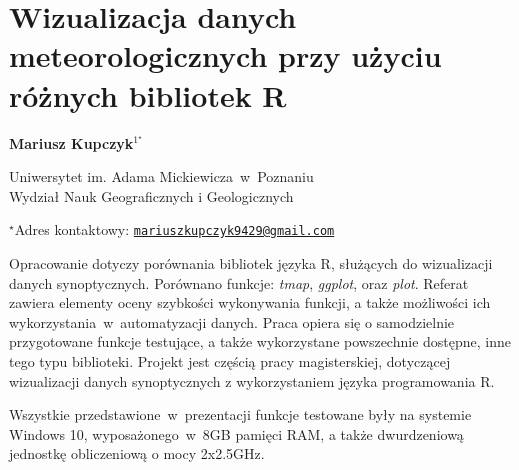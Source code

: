 \documentclass[\main/boa.tex]{subfiles}
\begin{document}
\sloppy


\section{Wizualizacja danych meteorologicznych przy użyciu różnych bibliotek R}

\begin{center}
  {\bf {} Mariusz Kupczyk$^{1^\star}$}
\end{center}

\vskip 0.3cm

\begin{affiliations}
\begin{enumerate}
\begin{minipage}{0.915\textwidth}
\centering
\item Uniwersytet im. Adama Mickiewicza~w~Poznaniu\\ Wydział Nauk Geograficznych i Geologicznych
\end{minipage}
\end{enumerate}
$^\star$Adres kontaktowy: \href{mailto:mariuszkupczyk9429@gmail.com	}{\nolinkurl{mariuszkupczyk9429@gmail.com}}\\
\end{affiliations}

\vskip 0.5cm


\vskip 0.5cm

Opracowanie dotyczy porównania bibliotek języka R, służących do wizualizacji danych synoptycznych. Porównano funkcje: \emph{tmap}, \emph{ggplot}, oraz \emph{plot}. Referat zawiera elementy oceny szybkości wykonywania funkcji, a także możliwości ich wykorzystania~w~automatyzacji danych. Praca opiera się o samodzielnie przygotowane funkcje testujące, a także wykorzystane powszechnie dostępne, inne tego typu biblioteki. Projekt jest częścią pracy magisterskiej, dotyczącej wizualizacji danych synoptycznych z wykorzystaniem języka programowania R. 

Wszystkie przedstawione~w~prezentacji funkcje testowane były na systemie Windows 10, wyposażonego~w~8GB pamięci RAM, a także dwurdzeniową jednostkę obliczeniową o mocy 2x2.5GHz. 
\end{document}

